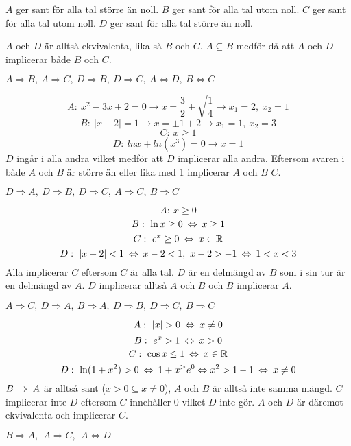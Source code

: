 \begin{task}{1.6}
	$A$ ger sant för alla tal större än noll. $B$ ger sant för alla tal utom noll. $C$ ger sant för alla tal utom noll. $D$ ger sant för alla tal större än noll. 
	
	$A$ och $D$ är alltså ekvivalenta, lika så $B$ och $C$. $A\subseteq B$ medför då att $A$ och $D$ implicerar både $B$ och $C$.
	
	\ans $A \Rightarrow B,~ A \Rightarrow C,~ D \Rightarrow B,~ D \Rightarrow C,~ A \Leftrightarrow D,~ B \Leftrightarrow C$
\end{task}

\begin{task}{1.7}
	\[A:~x^2-3x+2=0 \rightarrow x = \frac{3}{2} \pm \sqrt{\frac{1}{4}} \rightarrow x_1 = 2,~x_2 = 1\]
	\[B:~|x-2|=1 \rightarrow x=\pm 1+2 \rightarrow x_1=1,~x_2=3\]
	\[C:~x \ge 1\]
	\[D:~lnx + ln(x^3) = 0 \rightarrow x=1\]
	$D$ ingår i alla andra vilket medför att $D$ implicerar alla andra. Eftersom svaren i både $A$ och $B$ är större än eller lika med 1 implicerar $A$ och $B$ $C$.
	
	\ans $D \Rightarrow A,~ D \Rightarrow B,~ D \Rightarrow C,~ A \Rightarrow C,~ B \Rightarrow C$
\end{task}

\begin{task}{1.8}
	\[A:~x\ge 0\]
	\[B:~\ln x \ge 0 \lra x\ge 1\]
	\[C:~e^x \ge 0 \lra x \in \mathbb{R}\]
	\[D:~|x-2|<1 \lra x-2<1,~x-2>-1 \lra 1<x<3\]
	Alla implicerar $C$ eftersom $C$ är alla tal. $D$ är en delmängd av $B$ som i sin tur är en delmängd av $A$. $D$ implicerar alltså $A$ och $B$ och $B$ implicerar $A$.
	
	\ans $A \Rightarrow C,~ D \Rightarrow A,~ B \Rightarrow A,~ D \Rightarrow B,~ D \Rightarrow C,~ B \Rightarrow C$
\end{task}

\begin{task}{1.9}
	\[A:~|x|>0 \lra x\neq 0\]
	\[B:~e^x > 1 \lra x > 0\]
	\[C:~\cos x \le 1 \lra x \in \mathbb{R}\]
	\[D:~\ln(1+x^2)>0 \lra 1+x^>e^0 \Leftrightarrow x^2>1-1 \lra x\neq 0\]
	$B\ra A$ är alltså sant ($x > 0\subseteq x\neq 0$), $A$ och $B$ är alltså inte samma mängd. $C$ implicerar inte $D$ eftersom $C$ innehåller 0 vilket $D$ inte gör. $A$ och $D$ är däremot ekvivalenta och implicerar $C$.
	
	\ans $B \Rightarrow A,~~ A \Rightarrow C,~~ A \Leftrightarrow D$
\end{task}